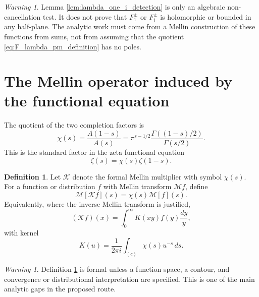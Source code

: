 \documentclass[11pt]{amsart}
\numberwithin{equation}{section}
\theoremstyle{plain}
\theoremstyle{definition}
\newtheorem{definition}[theorem]{Definition}
\theoremstyle{remark}
\newtheorem{warning}[theorem]{Warning}
\begin{document}
\begin{warning}
\label{warn:numerators_not_enough}
Lemma \ref{lem:lambda_one_i_detection} is only an algebraic non-cancellation test.  It does not prove that \(F_1^{\pm}\) or \(F_i^{\pm}\) is holomorphic or bounded in any half-plane.  The analytic work must come from a Mellin construction of these functions from sums, not from assuming that the quotient \eqref{eq:F_lambda_pm_definition} has no poles.
\end{warning}

\section{The Mellin operator induced by the functional equation}
\label{sec:mellin_operator}

The quotient of the two completion factors is
\begin{equation}
\chi(s)=\frac{A(1-s)}{A(s)}
=\pi^{s-1/2}\frac{\Gamma((1-s)/2)}{\Gamma(s/2)}.
\label{eq:chi_definition}
\end{equation}
This is the standard factor in the zeta functional equation
\begin{equation}
\zeta(s)=\chi(s)\zeta(1-s).
\label{eq:zeta_functional_equation_chi}
\end{equation}

\begin{definition}
\label{def:mellin_K_operator}
Let \(\mathcal K\) denote the formal Mellin multiplier with symbol \(\chi(s)\).  For a function or distribution \(f\) with Mellin transform \(\mathcal M f\), define
\begin{equation}
\mathcal M[\mathcal K f](s)=\chi(s)\mathcal M[f](s).
\label{eq:K_mellin_multiplier_definition}
\end{equation}
Equivalently, where the inverse Mellin transform is justified,
\begin{equation}
(\mathcal K f)(x)=\int_0^{\infty}K(xy)f(y)\frac{dy}{y},
\label{eq:K_integral_operator_definition}
\end{equation}
with kernel
\begin{equation}
K(u)=\frac{1}{2\pi i}\int_{(c)}\chi(s)u^{-s}\,ds.
\label{eq:K_kernel_definition}
\end{equation}
\end{definition}

\begin{warning}
\label{warn:K_requires_function_spaces}
Definition \ref{def:mellin_K_operator} is formal unless a function space, a contour, and convergence or distributional interpretation are specified.  This is one of the main analytic gaps in the proposed route.
\end{warning}
\end{document}
